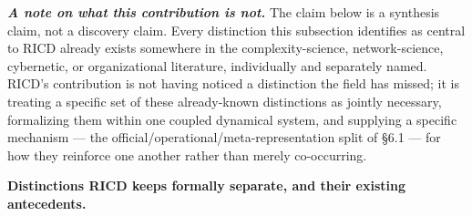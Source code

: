 \documentclass[
]{article}
\begin{document}
\emph{\textbf{A note on what this contribution is not.}} The claim below
is a synthesis claim, not a discovery claim. Every distinction this
subsection identifies as central to RICD already exists somewhere in the
complexity-science, network-science, cybernetic, or organizational
literature, individually and separately named. RICD's contribution is
not having noticed a distinction the field has missed; it is treating a
specific set of these already-known distinctions as jointly necessary,
formalizing them within one coupled dynamical system, and supplying a
specific mechanism --- the official/operational/meta-representation
split of §6.1 --- for how they reinforce one another rather than merely
co-occurring.

\textbf{Distinctions RICD keeps formally separate, and their existing
antecedents.}
\end{document}
